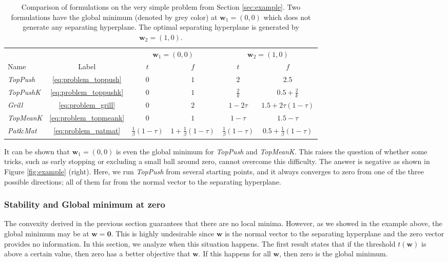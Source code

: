 \documentclass{Thesis}
\newcommand{\TopPush}{\emph{TopPush}\xspace}
\newcommand{\TopPushK}{\emph{TopPushK}\xspace}
\newcommand{\TopMeanK}{\emph{TopMeanK}\xspace}
\newcommand{\PatMat}{\emph{Pat}\&\emph{Mat}\xspace}
\newcommand{\Grill}{\emph{Grill}\xspace}
\begin{document}
\begin{table}[!ht]
  \caption{Comparison of formulations on the very simple problem from Section \ref{sec:example}. Two formulations have the global minimum (denoted by grey color) at $\bm{w}_1=(0,0)$ which does not generate any separating hyperplane. The optimal separating hyperplane is generated by $\bm{w}_2=(1,0)$.}
  \label{tab:example}
  \centering
  \begin{tabular}{@{}l ccccc@{}}\toprule
    & & \multicolumn{2}{c}{$\bm{w}_1=(0,0)$} & \multicolumn{2}{c}{$\bm{w}_2=(1,0)$} \\ \cmidrule(lr){3-4} \cmidrule(lr){5-6}
    Name & Label & $t$& $f$ & $t$ & $f$ \\
    \midrule
    \TopPush & \eqref{eq:problem_toppush} & $0$ & \cellcolor{gray!40}$1$ & $2$ & $2.5$ \\
    \TopPushK & \eqref{eq:problem_toppushk} & $0$ & $1$ & $\frac2k$ & \cellcolor{gray!40}$0.5+\frac2k$ \\
    \Grill & \eqref{eq:problem_grill} & $0$ & $2$ & $1-2\tau$ & \cellcolor{gray!40}$1.5+2\tau(1-\tau)$ \\
    \TopMeanK & \eqref{eq:problem_topmeank} & $0$ & \cellcolor{gray!40}$1$ & $1-\tau$ & $1.5-\tau$ \\
    \PatMat & \eqref{eq:problem_patmat}  & $\frac{1}{\beta}(1-\tau)$ & $1+\frac{1}{\beta}(1-\tau)$ & $\frac{1}{\beta}(1-\tau)$ & \cellcolor{gray!40}$0.5+\frac{1}{\beta}(1-\tau)$ \\
    \bottomrule
  \end{tabular}
\end{table}

It can be shown that $\bm{w}_1=(0,0)$ is even the global minimum for \TopPush and \TopMeanK. This raises the question of whether some tricks, such as early stopping or excluding a small ball around zero, cannot overcome this difficulty. The answer is negative as shown in Figure \ref{fig:example} (right). Here, we run \TopPush from several starting points, and it always converges to zero from one of the three possible directions; all of them far from the normal vector to the separating hyperplane.

\subsubsection{Stability and Global minimum at zero}\label{sec:w_zero}


The convexity derived in the previous section guarantees that there are no local minima. However, as we showed in the example above, the global minimum may be at $\bm{w} = \bm{0}$. This is highly undesirable since $\bm{w}$ is the normal vector to the separating hyperplane and the zero vector provides no information. In this section, we analyze when this situation happens. The first result states that if the threshold $t(\bm{w})$ is above a certain value, then zero has a better objective that $\bm{w}$. If this happens for all $\bm{w}$, then zero is the global minimum.
\end{document}
